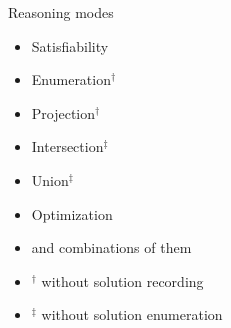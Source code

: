 \begin{frame}{Reasoning modes}
  \vfill
  \begin{itemize}
  \item Satisfiability
  \item Enumeration$^\dagger$
  \item Projection$^\dagger$
  \item Intersection$^\ddagger$
  \item Union$^\ddagger$
  \item Optimization
    \medskip
  \item and combinations of them
  \end{itemize}
  \vfill
  {\footnotesize
  \begin{itemize}
  \item []\hfill $^\dagger$ without solution recording
  \item []\hfill $^\ddagger$ without solution enumeration
  \end{itemize}}
\end{frame}
%
